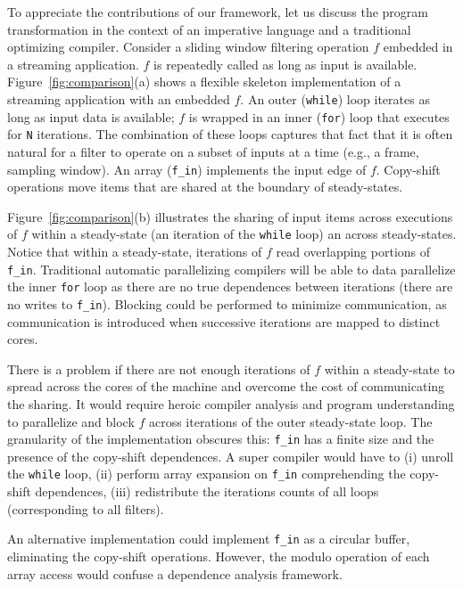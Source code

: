 To appreciate the contributions of our framework, let us discuss the
program transformation in the context of an imperative language and a
traditional optimizing compiler.  Consider a sliding window filtering
operation $f$ embedded in a streaming application.  $f$ is repeatedly
called as long as input is available.  Figure~\ref{fig:comparison}(a)
shows a flexible skeleton implementation of a streaming application
with an embedded $f$.  An outer ({\tt while}) loop iterates as long as
input data is available; $f$ is wrapped in an inner ({\tt for}) loop
that executes for {\tt N} iterations.  The combination of these loops
captures that fact that it is often natural for a filter to operate on
a subset of inputs at a time (e.g., a frame, sampling window). An
array ({\tt f\_in}) implements the input edge of $f$.  Copy-shift
operations move items that are shared at the boundary of
steady-states. 

Figure~\ref{fig:comparison}(b) illustrates the sharing of input items
across executions of $f$ within a steady-state (an iteration of the
{\tt while} loop) an across steady-states.  Notice that within a
steady-state, iterations of $f$ read overlapping portions of {\tt
  f\_in}.  Traditional automatic parallelizing compilers will be able
to data parallelize the inner {\tt for} loop as there are no true
dependences between iterations (there are no writes to {\tt f\_in}).
Blocking could be performed to minimize communication, as
communication is introduced when successive iterations are mapped to
distinct cores.  

There is a problem if there are not enough iterations of $f$ within a
steady-state to spread across the cores of the machine and overcome
the cost of communicating the sharing. It would require heroic
compiler analysis and program understanding to parallelize and block
$f$ across iterations of the outer steady-state loop.  The granularity
of the implementation obscures this: {\tt f\_in} has a finite size and
the presence of the copy-shift dependences.  A super compiler would
have to (i) unroll the {\tt while} loop, (ii) perform array expansion
on {\tt f\_in} comprehending the copy-shift dependences, (iii)
redistribute the iterations counts of all loops (corresponding to all
filters).

An alternative implementation could implement {\tt f\_in} as a
circular buffer, eliminating the copy-shift operations. However, the
modulo operation of each array access would confuse a dependence
analysis framework.

